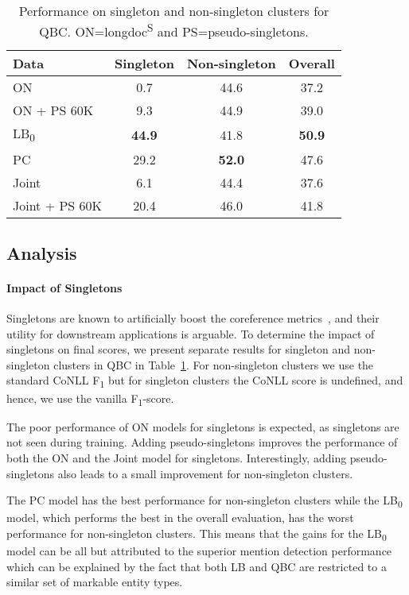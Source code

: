 \documentclass[12pt]{thesis-umich}[thesis]
\begin{document}
 \begin{table}[t!]
	\centering
	\begin{tabular}{lccc}
		\toprule
		Data & Singleton & Non-singleton & Overall \\
		\midrule
		ON &  \phantom{1}0.7 & 44.6 & 37.2 \\
		ON + PS 60K &  \phantom{1}9.3  & 44.9 & 39.0 \\
		LB\textsubscript{0} & \textbf{44.9} & 41.8 & \textbf{50.9} \\
		PC & 29.2 & \textbf{52.0} & 47.6 \\
		Joint & \phantom{1}6.1  & 44.4 & 37.6 \\
		Joint + PS 60K  & 20.4  & 46.0 & 41.8 \\ 
		\bottomrule
	\end{tabular}
	\caption{Performance on singleton and non-singleton clusters for QBC. ON=longdoc\textsuperscript{S} and PS=pseudo-singletons.}
	\label{tab:singleton_ment}
\end{table} 
\subsection{Analysis}
\paragraph{Impact of Singletons}


Singletons are known to artificially boost the coreference metrics~\cite{kubler-zhekova-2011-singletons}, and their utility for downstream applications is arguable. 
To determine the impact of singletons on final scores, we present separate results for singleton and non-singleton clusters in QBC in Table~\ref{tab:singleton_ment}. 
For non-singleton clusters we use the standard CoNLL F\textsubscript{1} but for singleton clusters the CoNLL score is undefined, and hence, we use the vanilla F\textsubscript{1}-score. 

The poor performance of ON models for singletons is expected, as singletons are not seen during training. Adding pseudo-singletons improves the performance of both the ON and the Joint model for singletons. Interestingly, adding pseudo-singletons also leads to a small improvement for non-singleton clusters. 

The PC model has the best performance for non-singleton clusters while the LB\textsubscript{0} model, which performs the best in the overall evaluation, has the worst performance for non-singleton clusters. This means that the gains for the LB\textsubscript{0} model can be all but attributed to the superior mention detection performance which can be explained by the fact that both LB and QBC are restricted to a similar set of markable entity types. 
\end{document}
